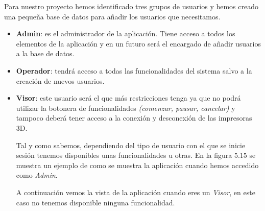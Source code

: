 Para nuestro proyecto hemos identificado tres grupos de usuarios y hemos creado una pequeña base de datos para añadir los usuarios que necesitamos.

\begin{itemize}
\item \textbf{Admin}: es el administrador de la aplicación. Tiene acceso a todos los elementos de la aplicación y en un futuro será el encargado de añadir usuarios a la base de datos.
\item \textbf{Operador}: tendrá acceso a todas las funcionalidades del sistema salvo a la creación de nuevos usuarios.
\item \textbf{Visor}: este usuario será el que más restricciones tenga ya que no podrá utilizar la botonera de funcionalidades \textit{(comenzar, pausar, cancelar)}  y tampoco deberá tener acceso a la conexión y desconexión de las impresoras 3D.



Tal y como sabemos, dependiendo del tipo de usuario con el que se inicie sesión tenemos disponibles unas funcionalidades u otras. En la figura 5.15 se muestra un ejemplo de como se muestra la aplicación cuando hemos accedido como \textit{Admin}.


A continuación vemos la vista de la aplicación cuando eres un \textit{Visor}, en este caso no tenemos disponible ninguna funcionalidad.


\end{itemize}

















